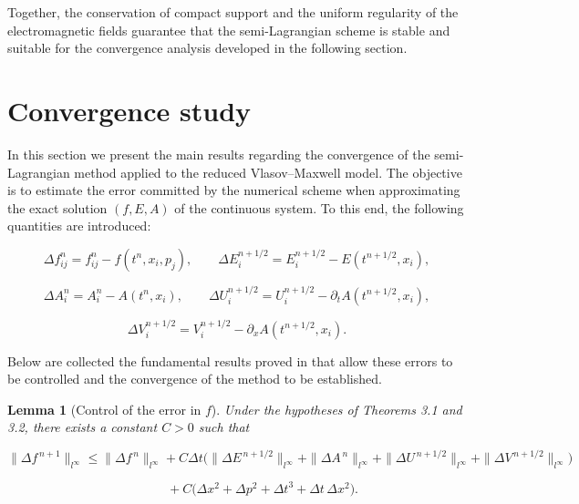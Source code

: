 \documentclass[11pt,a4paper,twoside,pdf]{article}
\numberwithin{equation}{section}
\newtheorem{lemma}[theorem]{Lemma}
\begin{document}
Together, the conservation of compact support and the uniform regularity of the
electromagnetic fields guarantee that the semi-Lagrangian scheme is stable and
suitable for the convergence analysis developed in the following section.



\newpage
\section{Convergence study}

In this section we present the main results regarding the convergence of the
semi-Lagrangian method applied to the reduced Vlasov--Maxwell model. The
objective is to estimate the error committed by the numerical scheme when approximating the
exact solution $(f,E,A)$ of the continuous system. To this end, the following quantities are introduced:


\[
\Delta f^n_{ij} = f^n_{ij} - f(t^n,x_i,p_j), \qquad
\Delta E^{n+1/2}_i = E^{n+1/2}_i - E(t^{n+1/2},x_i),
\]




\[
\Delta A^n_i = A^n_i - A(t^n,x_i), \qquad
\Delta U^{n+1/2}_i = U^{n+1/2}_i - \partial_t A(t^{n+1/2},x_i),
\]




\[
\Delta V^{n+1/2}_i = V^{n+1/2}_i - \partial_x A(t^{n+1/2},x_i).
\]



Below are collected the fundamental results proved in \cite{bostan2009convergence} that allow these
errors to be controlled and the convergence of the method to be established.\\





\begin{lemma}[Control of the error in $f$]
Under the hypotheses of Theorems 3.1 and 3.2, there exists a constant $C>0$ such that


\[
\|\Delta f^{\,n+1}\|_{l^\infty}
\le \|\Delta f^{\,n}\|_{l^\infty}
+ C\Delta t\big(
\|\Delta E^{\,n+1/2}\|_{l^\infty}
+ \|\Delta A^{\,n}\|_{l^\infty}
+ \|\Delta U^{\,n+1/2}\|_{l^\infty}
+ \|\Delta V^{\,n+1/2}\|_{l^\infty}
\big)
\]




\[
\qquad\qquad
+ C\big(\Delta x^2 + \Delta p^2 + \Delta t^3 + \Delta t\,\Delta x^2\big).
\]


\end{lemma}
\end{document}
